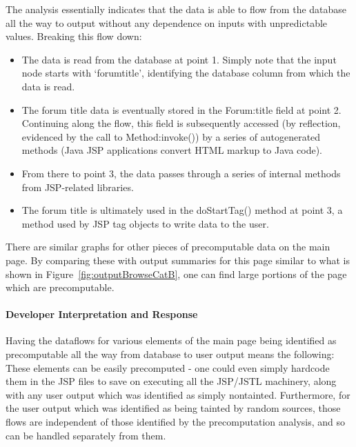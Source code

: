 \documentclass[msc,oneside]{ubcthesis}
\begin{document}
The analysis essentially indicates that the data is able to flow from the database all the way to output without any dependence on inputs with unpredictable values. Breaking this flow down:

\begin{itemize}
\item The data is read from the database at point 1. Simply note that the input node starts with `forumtitle', identifying the database column from which the data is read.
\item The forum title data is eventually stored in the Forum:title field at point 2. Continuing along the flow, this field is subsequently accessed (by reflection, evidenced by the call to Method:invoke()) by a series of autogenerated methods (Java JSP applications convert HTML markup to Java code). 
\item From there to point 3, the data passes through a series of internal methods from JSP-related libraries.
\item The forum title is ultimately used in the doStartTag() method at point 3, a method used by JSP tag objects to write data to the user.
\end{itemize}

There are similar graphs for other pieces of precomputable data on the main page. By comparing these with output summaries for this page similar to what is shown in Figure~\ref{fig:outputBrowseCatB}, one can find large portions of the page which are precomputable.
 
\paragraph{Developer Interpretation and Response}
Having the dataflows for various elements of the main page being identified as precomputable all the way from database to user output means the following: These elements can be easily precomputed - one could even simply hardcode them in the JSP files to save on executing all the JSP/JSTL machinery, along with any user output which was identified as simply nontainted. Furthermore, for the user output which was identified as being tainted by random sources, those flows are independent of those identified by the precomputation analysis, and so can be handled separately from them.
\end{document}
